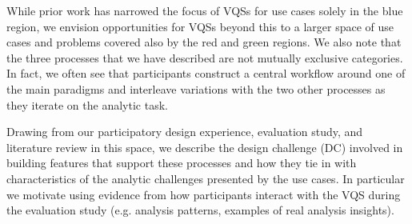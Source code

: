 \par While prior work has narrowed the focus of VQSs for use cases solely in the blue region, we envision opportunities for VQSs beyond this to a larger space of use cases and problems covered also by the red and green regions. We also note that the three processes that we have described are not mutually exclusive categories. In fact, we often see that participants construct a central workflow around one of the main paradigms and interleave variations with the two other processes as they iterate on the analytic task. 
\par Drawing from our participatory design experience, evaluation study, and literature review in this space, we describe the design challenge (DC) involved in building features that support these processes and how they tie in with characteristics of the analytic challenges presented by the use cases. In particular we motivate using evidence from how participants interact with the VQS during the evaluation study (e.g. analysis patterns, examples of real analysis insights). 

